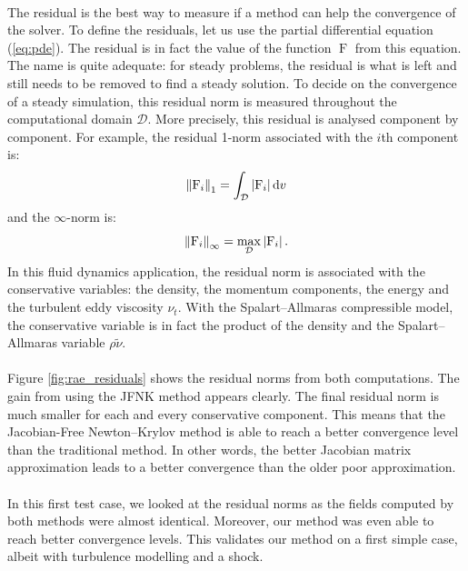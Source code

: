         \paragraph{}
        The residual is the best way to measure if a method can help the convergence of the solver.
        To define the residuals, let us use the partial differential equation (\ref{eq:pde}).
        The residual is in fact the value of the function $\operatorname{F}$ from this equation.
        The name is quite adequate: for steady problems, the residual is what is left and still needs to be removed to find a steady solution.
        To decide on the convergence of a steady simulation, this residual norm is measured throughout the computational domain $\mathcal{D}$.
        More precisely, this residual is analysed component by component.
        For example, the residual 1-norm associated with the $i$th component is:
        \begin{equation}
          \norm[1]{\operatorname{F}_i} = \int_\mathcal{D} \left| \operatorname{F}_i \right| \mathrm{d}v
        \end{equation}
        and the $\infty$-norm is:
        \begin{equation}
          \norm[\infty]{\operatorname{F}_i} = \max_\mathcal{D} \left| \operatorname{F}_i \right| .
        \end{equation}
        In this fluid dynamics application, the residual norm is associated with the conservative variables: the density, the momentum components, the energy and the turbulent eddy viscosity $\nu_t$.
        With the Spalart--Allmaras compressible model, the conservative variable is in fact the product of the density and the Spalart--Allmaras variable $\rho \tilde{\nu}$.

        \paragraph{}
        Figure \ref{fig:rae_residuals} shows the residual norms from both computations.
        The gain from using the JFNK method appears clearly.
        The final residual norm is much smaller for each and every conservative component.
        This means that the Jacobian-Free Newton--Krylov method is able to reach a better convergence level than the traditional method.
        In other words, the better Jacobian matrix approximation leads to a better convergence than the older poor approximation.

        \paragraph{}
        In this first test case, we looked at the residual norms as the fields computed by both methods were almost identical.
        Moreover, our method was even able to reach better convergence levels.
        This validates our method on a first simple case, albeit with turbulence modelling and a shock.


